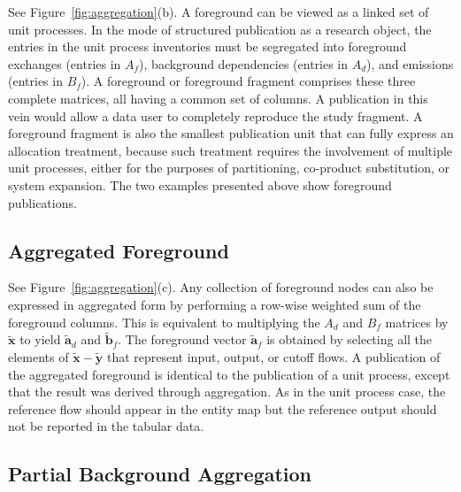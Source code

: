 See Figure~\ref{fig:aggregation}(b).  A foreground can be viewed as a linked set of unit processes.  In the mode of structured publication as a research object, the entries in the unit process inventories must be segregated into foreground exchanges (entries in $A_f$), background dependencies (entries in $A_d$), and emissions (entries in $B_f$).  A foreground or foreground fragment comprises these three complete matrices, all having a common set of columns.  A  publication in this vein would allow a data user to completely reproduce the study fragment.  A foreground fragment is also the smallest publication unit that can fully express an allocation treatment, because such treatment requires the involvement of multiple unit processes, either for the purposes of partitioning, co-product substitution, or system expansion.  The two examples presented above show foreground publications.

\subsection{Aggregated Foreground}

See Figure~\ref{fig:aggregation}(c). Any collection of foreground nodes can also be expressed in aggregated form by performing a row-wise weighted sum of the foreground columns.  This is equivalent to multiplying the $A_d$ and $B_f$ matrices by $\tilde{\mathbf{x}}$ to yield $\tilde{\mathbf{a}}_d$ and $\tilde{\mathbf{b}}_f$.
The foreground vector $\tilde{\mathbf{a}}_f$ is obtained by selecting all the elements of $\tilde{\mathbf{x}} - \tilde{\mathbf{y}}$ that represent input, output, or cutoff flows.  A publication of the aggregated foreground is identical to the publication of a unit process, except that the result was derived through aggregation.  As in the unit process case, the reference flow should appear in the entity map but the reference output should not be reported in the tabular data.

\subsection{Partial Background Aggregation}

